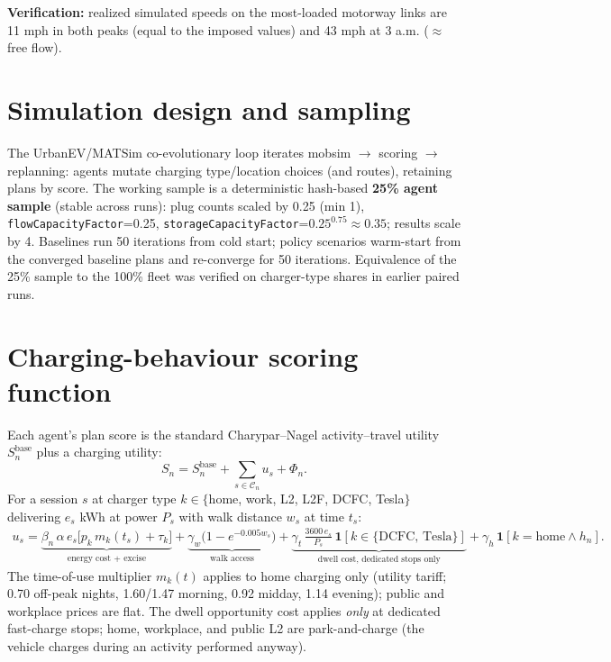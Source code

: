 \documentclass[11pt]{article}
\begin{document}
\textbf{Verification:} realized simulated speeds on the most-loaded motorway links
are 11 mph in both peaks (equal to the imposed values) and 43 mph at 3 a.m.
($\approx$free flow).

\section{Simulation design and sampling}
\label{sec:sim}
The UrbanEV/MATSim co-evolutionary loop iterates mobsim $\rightarrow$ scoring
$\rightarrow$ replanning: agents mutate charging type/location choices (and
routes), retaining plans by score. The working sample is a deterministic
hash-based \textbf{25\% agent sample} (stable across runs): plug counts scaled by
0.25 (min 1), \texttt{flowCapacityFactor}=0.25,
\texttt{storageCapacityFactor}=$0.25^{0.75}\!\approx\!0.35$; results scale by 4.
Baselines run 50 iterations from cold start; policy scenarios warm-start from the
converged baseline plans and re-converge for 50 iterations. Equivalence of the
25\% sample to the 100\% fleet was verified on charger-type shares in earlier
paired runs.

\section{Charging-behaviour scoring function}
\label{sec:scoring}
Each agent's plan score is the standard Charypar--Nagel activity--travel utility
$S^{\text{base}}_n$ plus a charging utility:
\begin{equation}
S_n = S^{\text{base}}_n + \sum_{s\in\mathcal{C}_n} u_s + \Phi_n .
\end{equation}
For a session $s$ at charger type $k\in\{$home, work, L2, L2F, DCFC, Tesla$\}$
delivering $e_s$ kWh at power $P_s$ with walk distance $w_s$ at time $t_s$:
\begin{align}
u_s = \underbrace{\beta_n\,\alpha\,e_s\big[p_{k}\,m_{k}(t_s)+\tau_{k}\big]}_{\text{energy cost + excise}}
+ \underbrace{\gamma_w\big(1-e^{-0.005 w_s}\big)}_{\text{walk access}}
+ \underbrace{\gamma_t\,\tfrac{3600\,e_s}{P_s}\,\mathbf{1}[k\in\{\text{DCFC, Tesla}\}]}_{\text{dwell cost, dedicated stops only}}
+ \gamma_h\,\mathbf{1}[k{=}\text{home}\wedge h_n].
\end{align}
The time-of-use multiplier $m_k(t)$ applies to home charging only (utility
tariff; 0.70 off-peak nights, 1.60/1.47 morning, 0.92 midday, 1.14 evening);
public and workplace prices are flat. The dwell opportunity cost applies
\emph{only} at dedicated fast-charge stops; home, workplace, and public L2 are
park-and-charge (the vehicle charges during an activity performed anyway).
\end{document}
